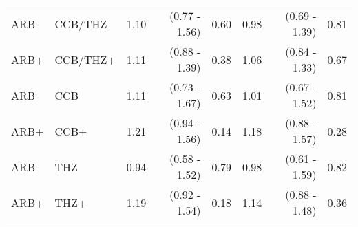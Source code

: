 \documentclass[11pt,]{article}
\begin{document}
\begin{table}[H]
{\begin{tabular}{llrrrrrr}
  ARB & CCB/THZ & 1.10 & (0.77 - 1.56) & 0.60 & 0.98 & (0.69 - 1.39) & 0.81 \\ 
  ARB+ & CCB/THZ+ & 1.11 & (0.88 - 1.39) & 0.38 & 1.06 & (0.84 - 1.33) & 0.67 \\ 
  ARB & CCB & 1.11 & (0.73 - 1.67) & 0.63 & 1.01 & (0.67 - 1.52) & 0.81 \\ 
  ARB+ & CCB+ & 1.21 & (0.94 - 1.56) & 0.14 & 1.18 & (0.88 - 1.57) & 0.28 \\ 
  ARB & THZ & 0.94 & (0.58 - 1.52) & 0.79 & 0.98 & (0.61 - 1.59) & 0.82 \\ 
  ARB+ & THZ+ & 1.19 & (0.92 - 1.54) & 0.18 & 1.14 & (0.88 - 1.48) & 0.36 \\ 
    \bottomrule
  \end{tabular}
  }
\end{table}
\begin{table}[H]
 \caption{Risk estimates for COVID-19 hospitalization across propensity score matched, prevalent-user cohorts in the SIDIAP data source. We report uncalibrated and calibrated hazard ratios (HRs) and their 95\% confidence intervals (CIs). (+) indicates in-combination cohorts.}
\end{table}
\end{document}
